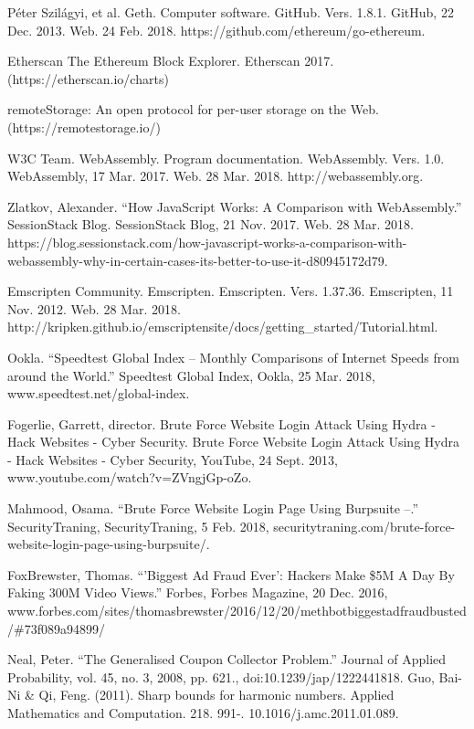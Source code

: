 \documentclass[runningheads]{llncs}
\begin{document}
\begin{thebibliography}{1}
Péter Szilágyi, et al. Geth. Computer software. GitHub. Vers. 1.8.1. GitHub, 22 Dec. 2013. Web. 24 Feb. 2018. https://github.com/ethereum/go-ethereum. 

Etherscan The Ethereum Block Explorer. Etherscan 2017. (https://etherscan.io/charts)

 remoteStorage: An open protocol for per-user storage on the Web. (https://remotestorage.io/)

  W3C Team. WebAssembly. Program documentation. WebAssembly. Vers. 1.0. WebAssembly, 17 Mar. 2017. Web. 28 Mar. 2018. http://webassembly.org. 

 Zlatkov, Alexander. ``How JavaScript Works: A Comparison with WebAssembly.'' SessionStack Blog. SessionStack Blog, 21 Nov. 2017. Web. 28 Mar. 2018. https://blog.sessionstack.com/how-javascript-works-a-comparison-with-webassembly-why-in-certain-cases-its-better-to-use-it-d80945172d79. 

 Emscripten Community. Emscripten. Emscripten. Vers. 1.37.36. Emscripten, 11 Nov. 2012. Web. 28 Mar. 2018. http://kripken.github.io/emscripten\-site/docs/getting\_started/Tutorial.html. 

 Ookla. ``Speedtest Global Index – Monthly Comparisons of Internet Speeds from around the World.'' Speedtest Global Index, Ookla, 25 Mar. 2018, www.speedtest.net/global-index.

  Fogerlie, Garrett, director. Brute Force Website Login Attack Using Hydra - Hack Websites - Cyber Security. Brute Force Website Login Attack Using Hydra - Hack Websites - Cyber Security, YouTube, 24 Sept. 2013, www.youtube.com/watch?v=ZVngjGp-oZo. 

 Mahmood, Osama. ``Brute Force Website Login Page Using Burpsuite –.'' SecurityTraning, SecurityTraning, 5 Feb. 2018, securitytraning.com/brute-force-website-login-page-using-burpsuite/. 

 Fox\-Brewster, Thomas. ``'Biggest Ad Fraud Ever': Hackers Make \$5M A Day By Faking 300M Video Views.'' Forbes, Forbes Magazine, 20 Dec. 2016, www.forbes.com/sites/thomasbrewster/2016/12/20/methbot\-biggest\-ad\-fraud\-busted/\#73f089a94899/ 

 Neal, Peter. ``The Generalised Coupon Collector Problem.'' Journal of Applied Probability, vol. 45, no. 3, 2008, pp. 621., doi:10.1239/jap/1222441818.
 Guo, Bai-Ni \& Qi, Feng. (2011). Sharp bounds for harmonic numbers. Applied Mathematics and Computation. 218. 991-. 10.1016/j.amc.2011.01.089.


\end{thebibliography}
\end{document}
